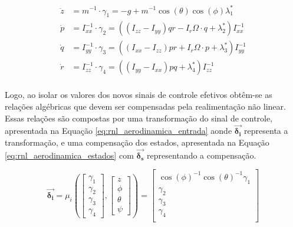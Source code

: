 \documentclass[main.tex]{subfiles}
\begin{document}
	\begin{equation}\label{eq:equivalencia}
		\begin{split}
			\ddot{z} &=  m^{-1}\cdot \gamma_1 = -g + m^{-1}\cos{(\theta)}\cos{(\phi)}\lambda_1^*\\
			\dot{p} &= I_{xx}^{-1}\cdot \gamma_2 = \left((I_{zz} - I_{yy})qr - I_r\Omega\cdot q + \lambda_2^*\right)I_{xx}^{-1}\\
			\dot{q} &= I_{yy}^{-1}\cdot \gamma_3 = \left((I_{xx} - I_{zz})pr + I_r\Omega\cdot p + \lambda_3^*\right)I_{yy}^{-1}\\
			\dot{r} &= I_{zz}^{-1}\cdot \gamma_4 = \left((I_{yy} - I_{xx})pq + \lambda_4^*\right)I_{zz}^{-1}\\
		\end{split}
	\end{equation}
	
	Logo, ao isolar os valores dos novos sinais de controle efetivos obtêm-se as relações algébricas que devem ser compensadas pela realimentação não linear. Essas relações são compostas por uma transformação do sinal de controle, apresentada na Equação \ref{eq:rnl_aerodinamica_entrada} aonde $\boldsymbol{\vec{\delta_i}}$ representa a transformação, e uma compensação dos estados, apresentada na Equação \ref{eq:rnl_aerodinamica_estados} com $\boldsymbol{\vec{\delta_s}}$ representando a compensação.
	
	
	\begin{equation}\label{eq:rnl_aerodinamica_entrada}
		\boldsymbol{\vec{\delta_i}} = \mu_i\left(\begin{bmatrix}
			\gamma_1\\
			\gamma_2\\
			\gamma_3\\
			\gamma_4
		\end{bmatrix}, \begin{bmatrix}
			z\\
			\phi\\
			\theta\\
			\psi
		\end{bmatrix}\right) = \begin{bmatrix}
			\cos(\phi)^{-1}\cos(\theta)^{-1}\gamma_1\\
			\gamma_2\\
			\gamma_3\\
			\gamma_4\\
		\end{bmatrix}
	\end{equation}
	
\end{document}
